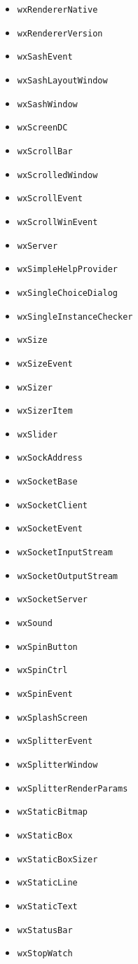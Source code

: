\documentclass[a4paper,11pt,oneside,titlepage]{report}
\begin{document}
\begin{itemize}
\item \texttt{wxRendererNative}
\item \texttt{wxRendererVersion}
\item \texttt{wxSashEvent}
\item \texttt{wxSashLayoutWindow}
\item \texttt{wxSashWindow}
\item \texttt{wxScreenDC}
\item \texttt{wxScrollBar}
\item \texttt{wxScrolledWindow}
\item \texttt{wxScrollEvent}
\item \texttt{wxScrollWinEvent}
\item \texttt{wxServer}
\item \texttt{wxSimpleHelpProvider}
\item \texttt{wxSingleChoiceDialog}
\item \texttt{wxSingleInstanceChecker}
\item \texttt{wxSize}
\item \texttt{wxSizeEvent}
\item \texttt{wxSizer}
\item \texttt{wxSizerItem}
\item \texttt{wxSlider}
\item \texttt{wxSockAddress}
\item \texttt{wxSocketBase}
\item \texttt{wxSocketClient}
\item \texttt{wxSocketEvent}
\item \texttt{wxSocketInputStream}
\item \texttt{wxSocketOutputStream}
\item \texttt{wxSocketServer}
\item \texttt{wxSound}
\item \texttt{wxSpinButton}
\item \texttt{wxSpinCtrl}
\item \texttt{wxSpinEvent}
\item \texttt{wxSplashScreen}
\item \texttt{wxSplitterEvent}
\item \texttt{wxSplitterWindow}
\item \texttt{wxSplitterRenderParams}
\item \texttt{wxStaticBitmap}
\item \texttt{wxStaticBox}
\item \texttt{wxStaticBoxSizer}
\item \texttt{wxStaticLine}
\item \texttt{wxStaticText}
\item \texttt{wxStatusBar}
\item \texttt{wxStopWatch}


\end{itemize}
\end{document}
